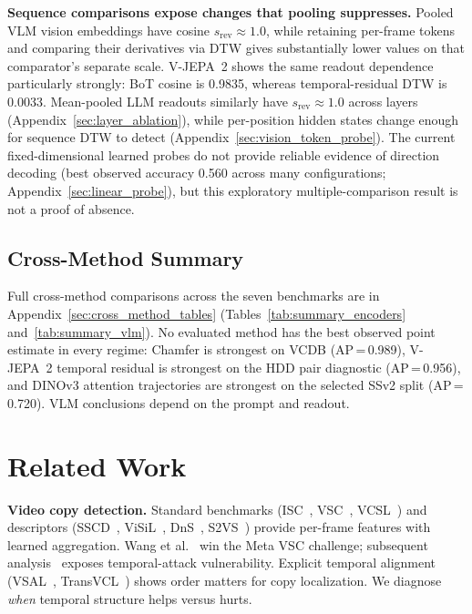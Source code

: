 \documentclass{article}
\theoremstyle{remark}
\begin{document}
\textbf{Sequence comparisons expose changes that pooling suppresses.} Pooled VLM vision embeddings have cosine $s_\text{rev} \approx 1.0$, while retaining per-frame tokens and comparing their derivatives via DTW gives substantially lower values on that comparator's separate scale. V-JEPA~2 shows the same readout dependence particularly strongly: BoT cosine is 0.9835, whereas temporal-residual DTW is 0.0033. Mean-pooled LLM readouts similarly have $s_\text{rev} \approx 1.0$ across layers (Appendix~\ref{sec:layer_ablation}), while per-position hidden states change enough for sequence DTW to detect (Appendix~\ref{sec:vision_token_probe}). The current fixed-dimensional learned probes do not provide reliable evidence of direction decoding (best observed accuracy 0.560 across many configurations; Appendix~\ref{sec:linear_probe}), but this exploratory multiple-comparison result is not a proof of absence.

\subsection{Cross-Method Summary}

Full cross-method comparisons across the seven benchmarks are in Appendix~\ref{sec:cross_method_tables} (Tables~\ref{tab:summary_encoders} and~\ref{tab:summary_vlm}). No evaluated method has the best observed point estimate in every regime: Chamfer is strongest on VCDB (AP\,=\,0.989), V-JEPA~2 temporal residual is strongest on the HDD pair diagnostic (AP\,=\,0.956), and DINOv3 attention trajectories are strongest on the selected SSv2 split (AP\,=\,0.720). VLM conclusions depend on the prompt and readout.

\section{Related Work}
\label{sec:related_work}

\textbf{Video copy detection.} Standard benchmarks (ISC~\cite{douze2021isc}, VSC~\cite{pizzi2023vsc}, VCSL~\cite{he2022vcsl}) and descriptors (SSCD~\cite{pizzi2022sscd}, ViSiL~\cite{kordopatis2019visil}, DnS~\cite{kordopatis2022dns}, S2VS~\cite{s2vs}) provide per-frame features with learned aggregation. Wang et al.~\cite{wang2023duallevel} win the Meta VSC challenge; subsequent analysis~\cite{fojcik2025} exposes temporal-attack vulnerability. Explicit temporal alignment (VSAL~\cite{han2021vsal}, TransVCL~\cite{he2023transvcl}) shows order matters for copy localization. We diagnose \emph{when} temporal structure helps versus hurts.
\end{document}
